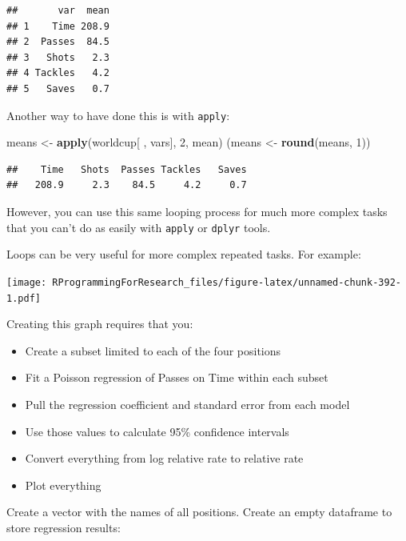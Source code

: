 \documentclass[]{book}
\makeatletter
\newenvironment{Shaded}{\begin{snugshade}}{\end{snugshade}}
\newcommand{\KeywordTok}[1]{\textcolor[rgb]{0.13,0.29,0.53}{\textbf{#1}}}
\newcommand{\DecValTok}[1]{\textcolor[rgb]{0.00,0.00,0.81}{#1}}
\newcommand{\StringTok}[1]{\textcolor[rgb]{0.31,0.60,0.02}{#1}}
\newcommand{\OperatorTok}[1]{\textcolor[rgb]{0.81,0.36,0.00}{\textbf{#1}}}
\newcommand{\NormalTok}[1]{#1}
\providecommand{\tightlist}{%
  \setlength{\itemsep}{0pt}\setlength{\parskip}{0pt}}
\newenvironment{kframe}{%
\medskip{}
\setlength{\fboxsep}{.8em}
 \def\at@end@of@kframe{}%
 \ifinner\ifhmode%
  \def\at@end@of@kframe{\end{minipage}}%
  \begin{minipage}{\columnwidth}%
 \fi\fi%
 \def\FrameCommand##1{\hskip\@totalleftmargin \hskip-\fboxsep
 \colorbox{shadecolor}{##1}\hskip-\fboxsep
     \hskip-\linewidth \hskip-\@totalleftmargin \hskip\columnwidth}%
 \MakeFramed {\advance\hsize-\width
   \@totalleftmargin\z@ \linewidth\hsize
   \@setminipage}}%
 {\par\unskip\endMakeFramed%
 \at@end@of@kframe}
\renewenvironment{Shaded}{\begin{kframe}}{\end{kframe}}
\theoremstyle{definition}
\theoremstyle{definition}
\theoremstyle{definition}
\theoremstyle{remark}
\makeatother
\begin{document}
\begin{verbatim}
##       var  mean
## 1    Time 208.9
## 2  Passes  84.5
## 3   Shots   2.3
## 4 Tackles   4.2
## 5   Saves   0.7
\end{verbatim}

Another way to have done this is with \texttt{apply}:

\begin{Shaded}
\begin{Highlighting}[]
\NormalTok{means <-}\StringTok{ }\KeywordTok{apply}\NormalTok{(worldcup[ , vars], }\DecValTok{2}\NormalTok{, mean)}
\NormalTok{(means <-}\StringTok{ }\KeywordTok{round}\NormalTok{(means, }\DecValTok{1}\NormalTok{))}
\end{Highlighting}
\end{Shaded}

\begin{verbatim}
##    Time   Shots  Passes Tackles   Saves 
##   208.9     2.3    84.5     4.2     0.7
\end{verbatim}

However, you can use this same looping process for much more complex
tasks that you can't do as easily with \texttt{apply} or \texttt{dplyr}
tools.

Loops can be very useful for more complex repeated tasks. For example:

\texttt{[image: RProgrammingForResearch\_files/figure-latex/unnamed-chunk-392-1.pdf]}

Creating this graph requires that you:

\begin{itemize}
\tightlist
\item
  Create a subset limited to each of the four positions
\item
  Fit a Poisson regression of Passes on Time within each subset
\item
  Pull the regression coefficient and standard error from each model
\item
  Use those values to calculate 95\% confidence intervals
\item
  Convert everything from log relative rate to relative rate
\item
  Plot everything
\end{itemize}

Create a vector with the names of all positions. Create an empty
dataframe to store regression results:

\begin{Shaded}
\end{Shaded}
\end{document}
